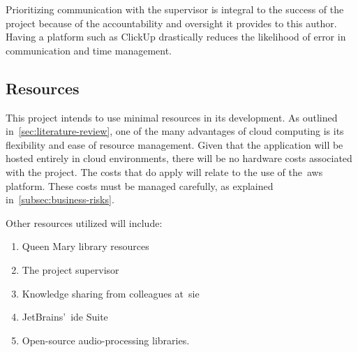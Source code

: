 Prioritizing communication with the supervisor is integral to the success of the project because of the accountability and oversight it provides to this author.
Having a platform such as ClickUp drastically reduces the likelihood of error in communication and time management.

\subsection{Resources}\label{subsec:resources}

This project intends to use minimal resources in its development.
As outlined in~\ref{sec:literature-review}, one of the many advantages of cloud computing is its flexibility and ease of resource management.
Given that the application will be hosted entirely in cloud environments, there will be no hardware costs associated with the project.
The costs that do apply will relate to the use of the~\gls{aws} platform.
These costs must be managed carefully, as explained in~\ref{subsec:business-risks}.

Other resources utilized will include:

\begin{enumerate}
    \item Queen Mary library resources
    \item The project supervisor
    \item Knowledge sharing from colleagues at~\gls{sie}
    \item JetBrains’~\gls{ide} Suite
    \item Open-source audio-processing libraries.
\end{enumerate}
